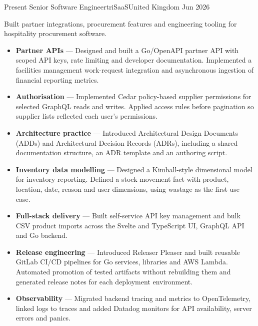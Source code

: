 %
%
%
\begin{experiences}
  \experience
    {Present}   {Senior Software Engineer}{triSaaS}{United Kingdom}
    {Jun 2026} {
                      Built partner integrations, procurement features and engineering tooling for hospitality procurement software.
                      \begin{itemize}
                        \item \textbf{Partner APIs} --- Designed and built a Go/OpenAPI partner API with scoped API keys, rate limiting and developer documentation. Implemented a facilities management work-request integration and asynchronous ingestion of financial reporting metrics.
                        \item \textbf{Authorisation} --- Implemented Cedar policy-based supplier permissions for selected GraphQL reads and writes. Applied access rules before pagination so supplier lists reflected each user's permissions.
                        \item \textbf{Architecture practice} --- Introduced Architectural Design Documents (ADDs) and Architectural Decision Records (ADRs), including a shared documentation structure, an ADR template and an authoring script.
                        \item \textbf{Inventory data modelling} --- Designed a Kimball-style dimensional model for inventory reporting. Defined a stock movement fact with product, location, date, reason and user dimensions, using wastage as the first use case.
                        \item \textbf{Full-stack delivery} --- Built self-service API key management and bulk CSV product imports across the Svelte and TypeScript UI, GraphQL API and Go backend.
                        \item \textbf{Release engineering} --- Introduced Releaser Pleaser and built reusable GitLab CI/CD pipelines for Go services, libraries and AWS Lambda. Automated promotion of tested artifacts without rebuilding them and generated release notes for each deployment environment.
                        \item \textbf{Observability} --- Migrated backend tracing and metrics to OpenTelemetry, linked logs to traces and added Datadog monitors for API availability, server errors and panics.

\end{itemize}}
\end{experiences}
